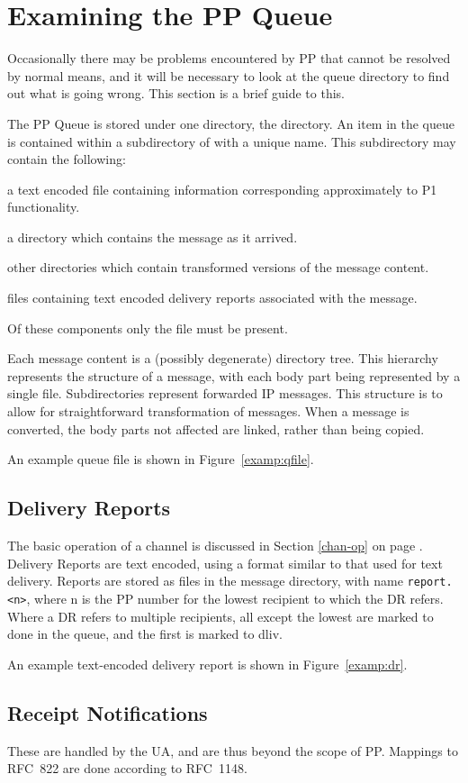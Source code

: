 \section {Examining the PP Queue}

Occasionally there may be problems encountered by PP that cannot be
resolved by normal means, and it will be necessary to look at the
queue directory to find out what is going wrong. This section is a
brief guide to this.

The PP Queue is stored under one directory, the  directory.
An item in the queue is contained within a subdirectory of 
with a unique name.
This subdirectory may contain the following:
\begin{describe}
\item[\verb|\file{addr}|:] a text encoded file containing information
corresponding approximately to P1 functionality.
\item[\verb|\file{base}|:] a directory which
contains the message as it arrived.
\item[\verb|\file{filter.number}:|] other directories
which contain transformed versions of the message content.
\item[\verb|\file{report.number}:|] files containing text
encoded delivery reports associated with the message.
\end{describe}
Of these components only the  file must be present.

Each message content is a (possibly degenerate) directory tree.  This
hierarchy represents the structure of a message, with each body part being
represented by a single file.  Subdirectories represent forwarded IP
messages.  This structure is to allow for straightforward transformation of
messages.  When a message is converted, the body parts not affected are
linked, rather than being copied.

An example queue file is shown in Figure~\ref{examp:qfile}.


\subsection {Delivery Reports}

The basic operation of a channel is discussed in Section \ref{chan-op}
on page \pageref{chan-op}.  Delivery Reports are text encoded, using a
format similar to that used for text delivery.  Reports are stored as
files in the message directory, with name \verb+report.<n>+, where n
is the PP number for the lowest recipient to which the DR refers.
Where a DR refers to multiple recipients, all except the lowest are
marked to done in the queue, and the first is marked to dliv.

An example text-encoded delivery report is shown in
Figure~\ref{examp:dr}.


\subsection {Receipt Notifications}

These are handled by the UA, and are thus beyond the scope of PP.
Mappings to RFC~822 are done according to RFC~1148.
